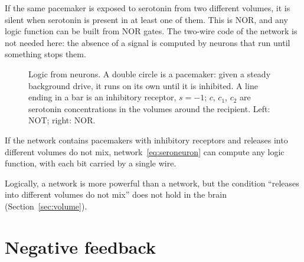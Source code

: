 If the same pacemaker is exposed to serotonin from two different volumes, it is silent when serotonin is present in at least one of them. This is NOR, and any logic function can be built from NOR gates. The two-wire code of the  network is not needed here: the absence of a signal is computed by neurons that run until something stops them.

\begin{figure}[t]
\centering
{}
\caption{Logic from  neurons. A double circle is a pacemaker: given a steady background drive, it runs on its own until it is inhibited. A line ending in a bar is an inhibitory receptor, $s=-1$; $c$, $c_1$, $c_2$ are serotonin concentrations in the volumes around the recipient. Left: NOT; right: NOR.}
\label{fig:serogates}
\end{figure}

\begin{keyblock}
\begin{proposition}
\label{prop:serocomplete}
If the network contains pacemakers with inhibitory receptors and releases into different volumes do not mix, network~\eqref{eq:seroneuron} can compute any logic function, with each bit carried by a single wire.
\end{proposition}
\end{keyblock}

Logically, a  network is more powerful than a  network, but the condition ``releases into different volumes do not mix'' does not hold in the brain (Section~\ref{sec:volume}).

\section{Negative feedback}


